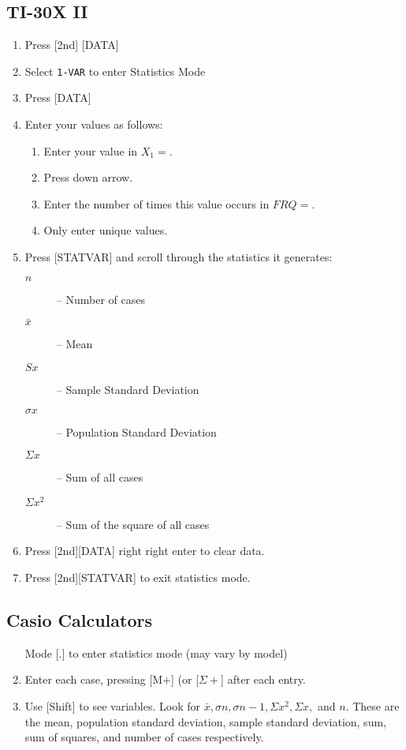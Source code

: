 \documentclass{article}
\begin{document}
\subsection{TI-30X II}
\begin{enumerate}
    \item Press [2nd] [DATA] 
    \item Select \verb!1-VAR! to enter Statistics Mode
    \item Press [DATA]
    \item Enter your values as follows: 
        \begin{enumerate}
            \item Enter your value in $X_1=$.
            \item Press down arrow.
            \item Enter the number of times this value occurs in
                $FRQ=$.
            \item Only enter unique values.
        \end{enumerate}
    \item Press [STATVAR] and scroll through the statistics it
        generates:
        \begin{description}
            \item[$n$] -- Number of cases
            \item[$\bar{x}$] -- Mean
            \item[$Sx$] -- Sample Standard Deviation
            \item[$\sigma x$] -- Population Standard Deviation
            \item[$\Sigma x$] -- Sum of all cases
            \item[$\Sigma x^2$] -- Sum of the square of all cases
        \end{description}
    \item Press [2nd][DATA] right right enter to clear data.
    \item Press [2nd][STATVAR] to exit statistics mode.
\end{enumerate}

\subsection{Casio Calculators}
\begin{enumerate}
    \item [Mode][.] to enter statistics mode (may vary by model)
    \item Enter each case, pressing [M+] (or [$\Sigma+$] after each
        entry.
    \item Use [Shift] to see variables.  Look for $\bar{x}, \sigma n,
    \sigma n-1, \Sigma x^2, \Sigma x,$ and $n$.  These are the mean,
        population standard deviation, sample standard deviation, sum,
        sum of squares, and number of cases respectively.
\end{enumerate}
\end{document}
